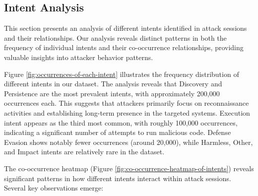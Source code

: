     \vspace{-0.5cm}

    \subsection{Intent Analysis}
    
        This section presents an analysis of different intents identified in attack sessions and their relationships. Our analysis reveals distinct patterns in both the frequency of individual intents and their co-occurrence relationships, providing valuable insights into attacker behavior patterns.

        Figure \ref{fig:occurrences-of-each-intent} illustrates the frequency distribution of different intents in our dataset. The analysis reveals that Discovery and Persistence are the most prevalent intents, with approximately 200,000 occurrences each. This suggests that attackers primarily focus on reconnaissance activities and establishing long-term presence in the targeted systems. Execution intent appears as the third most common, with roughly 100,000 occurrences, indicating a significant number of attempts to run malicious code. Defense Evasion shows notably fewer occurrences (around 20,000), while Harmless, Other, and Impact intents are relatively rare in the dataset.

        The co-occurrence heatmap (Figure \ref{fig:co-occurrence-heatmap-of-intents}) reveals significant patterns in how different intents interact within attack sessions. Several key observations emerge:
        
        \vspace{0.2em}

